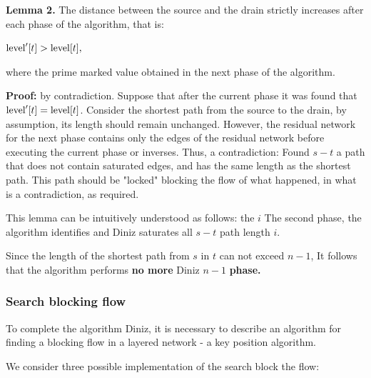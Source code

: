 \textbf{Lemma 2.} The distance between the source and the drain strictly increases after each phase of the algorithm, that is:

${\rm level} ^ \prime [t]> {\rm level} [t],$

where the prime marked value obtained in the next phase of the algorithm.

\textbf{Proof:} by contradiction. Suppose that after the current phase it was found that ${\rm level} ^ \prime [t] = {\rm level} [t]$. Consider the shortest path from the source to the drain, by assumption, its length should remain unchanged. However, the residual network for the next phase contains only the edges of the residual network before executing the current phase or inverses. Thus, a contradiction: Found $s-t$ a path that does not contain saturated edges, and has the same length as the shortest path. This path should be "locked" blocking the flow of what happened, in what is a contradiction, as required.

This lemma can be intuitively understood as follows: the $i$ The second phase, the algorithm identifies and Diniz saturates all $s-t$ path length $i$.

Since the length of the shortest path from $s$ in $t$ can not exceed $n-1$, It follows that the algorithm performs \textbf{no more} Diniz \textbf{$n-1$} \textbf{phase.}

\subsubsection{ Search blocking flow }

To complete the algorithm Diniz, it is necessary to describe an algorithm for finding a blocking flow in a layered network - a key position algorithm.

We consider three possible implementation of the search block the flow:


